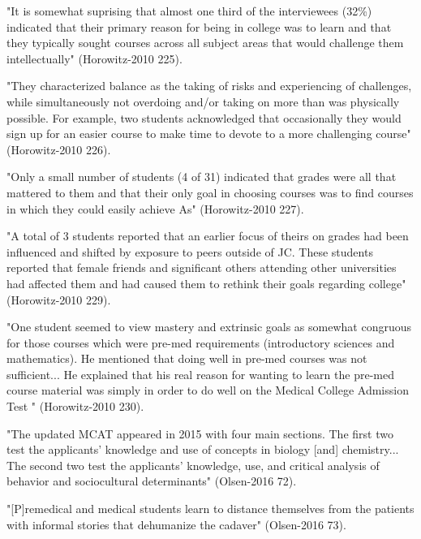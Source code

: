 

"It is somewhat suprising that almost one third of the interviewees (32\%) indicated that their primary reason for being in college was to learn and that they typically sought courses across all subject areas that would challenge them intellectually" (Horowitz-2010 225).

"They
characterized balance as the taking of risks and experiencing of challenges, while simultaneously not overdoing and/or taking on more than was physically possible. For example, two students acknowledged that occasionally they would sign up for an easier course to make time to devote to a more challenging course" (Horowitz-2010 226).


"Only a small number of students (4 of 31) indicated that grades were all that mattered to them and that their only goal in choosing courses was to find courses in which they could easily achieve As" (Horowitz-2010 227).

"A total of 3 students reported that an earlier focus of theirs on grades had been
influenced and shifted by exposure to peers outside of JC. These students reported
that female friends and significant others attending other universities had affected
them and had caused them to rethink their goals regarding college" (Horowitz-2010 229).

"One student seemed to view mastery and extrinsic goals as somewhat congruous for those courses which were pre-med requirements (introductory sciences and mathematics). He mentioned that doing well in pre-med courses was not sufficient... He explained that his real reason for wanting to learn the pre-med course material was simply in order to do well on the Medical College Admission Test " (Horowitz-2010 230).




"The updated MCAT appeared in 2015 with four main sections. The first two test the applicants' knowledge and use of concepts in biology [and] chemistry... The second two test the applicants' knowledge, use, and critical analysis of behavior and sociocultural determinants" (Olsen-2016 72).

"[P]remedical and medical students learn to distance themselves from the patients with informal stories that dehumanize the cadaver" (Olsen-2016 73).

